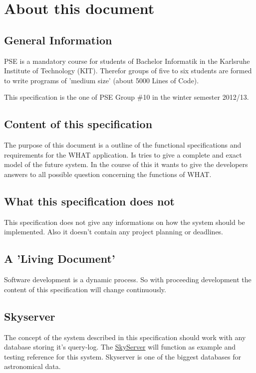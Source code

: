 \section*{About this document}

\subsection*{General Information}
PSE is a mandatory course for students of Bachelor Informatik in the %
Karlsruhe Institute of Technology (KIT). Therefor groups of five to six
students are formed to write programs of 'medium size' (about 5000 Lines of Code).

This specification is the one of PSE Group \#10 in the winter semester 2012/13.


\subsection*{Content of this specification}
The purpose of this document is a outline of the functional specifications and requirements
for the WHAT application. Is tries to give a complete and exact model of the future system.
In the course of this it wants to give the developers answers to all possible question concerning
the functions of WHAT.


\subsection*{What this specification does not}
This specification does not give any informations on how the system should be implemented. Also it doesn't 
contain any project planning or deadlines.


\subsection*{A 'Living Document'}
Software development is a dynamic process. So with proceeding development the
content of this specification will change continuously. 


\subsection*{Skyserver}
The concept of the system described in this specification should work with any database
storing it's query-log. The \href{http://skyserver.sdss.org/public/en/}{SkyServer} will function
as example and testing reference for this system. Skyserver is one of the biggest databases for astronomical data.


